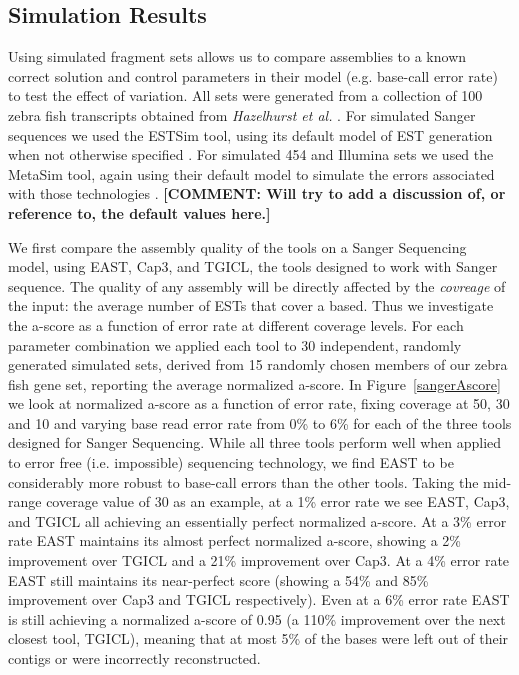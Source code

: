 \documentclass[10pt]{bmc_article}
\newcommand{\capthree} {{\small Cap3}}
\newcommand{\estsim}{{\small ESTSim}}
\newcommand{\metasim} {{\small MetaSim}}
\newcommand{\tgicl} {{\small TGICL}}
\newcommand{\east} {{\small EAST}}
\newenvironment{bmcformat}{\begin{raggedright}\baselineskip20pt\sloppy\setboolean{publ}{false}}{\end{raggedright}\baselineskip20pt\sloppy}
\begin{document}
\begin{bmcformat}
\subsection*{Simulation Results}
Using simulated fragment sets allows us to compare assemblies to
a known correct solution and control parameters in their model
(e.g. base-call error rate) to test the effect of variation.  All sets
were generated from a collection of 100 zebra fish transcripts
obtained from {\it Hazelhurst et al.}  \cite{Hazelhurst08}.  For
simulated Sanger sequences we used the \estsim\/ tool, using its
default model of EST generation when not otherwise specified
\cite{Hazelhurst03}.  For simulated 454 and Illumina sets we used the
\metasim\/ tool, again using their default model to simulate the
errors associated with those technologies \cite{Richter08}. {\bf
  [COMMENT: Will try to add a discussion of, or reference to, the
  default values here.]}

\vspace{3mm}

 We first compare the
  assembly quality of the tools on a Sanger Sequencing model, using
  \east, \capthree, and \tgicl\/, the tools designed to work with
  Sanger sequence.  The quality of any assembly will be directly
  affected by the {\it covreage} of the input: the average number of
  ESTs that cover a based.  Thus we investigate the a-score as a
  function of error rate at different coverage levels.  For each
parameter combination we applied each tool to 30 independent, randomly
generated simulated sets, derived from 15 randomly chosen members of
our zebra fish gene set, reporting the average normalized a-score.  In
Figure~\ref{sangerAscore} we look at normalized a-score as a function
of error rate, fixing coverage at 50, 30 and 10 and varying base read
error rate from 0\% to 6\% for each of the three tools designed for
Sanger Sequencing.  While all three tools perform well when applied to
error free (i.e. impossible) sequencing technology, we find \east\/ to
be considerably more robust to base-call errors than the other tools.
Taking the mid-range coverage value of 30 as an example, at a 1\%
error rate we see \east, \capthree, and \tgicl\/ all achieving an
essentially perfect normalized a-score.  At a 3\% error rate \east\/
maintains its almost perfect normalized a-score, showing a 2\%
improvement over \tgicl\/ and a 21\% improvement over \capthree.  At a
4\% error rate \east\/ still maintains its near-perfect score (showing
a 54\% and 85\% improvement over \capthree\/ and \tgicl\/
respectively).  Even at a 6\% error rate \east\/ is still achieving a
normalized a-score of 0.95 (a 110\% improvement over the next closest
tool, \tgicl\/), meaning that at most 5\% of the bases were left out
of their contigs or were incorrectly reconstructed.



\end{bmcformat}
\end{document}
